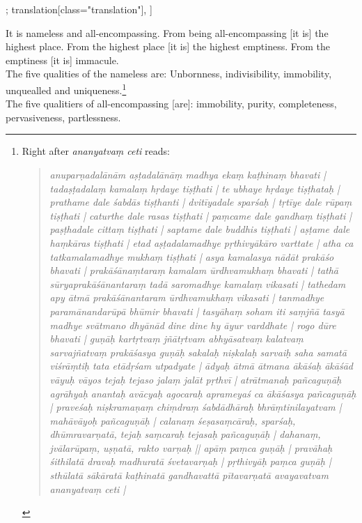 \begin{alignment}[
  texts=edition[class="edition"];
  translation[class="translation"],
  ]
\begin{translation}
\begin{tlate}
     It is nameless and all-encompassing. From being all-encompassing [it is] the highest place. From the highest place [it is] the highest emptiness. From the emptiness [it is] immacule. \\
     \indent
     The five qualities of the nameless are: Unbornness, indivisibility, immobility, unquealled and uniqueness.\footnote{Right after \textit{ananyatvaṃ ceti}  reads: \begin{quote}\textit{anuparṇadalānām aṣṭadalānāṃ madhya ekaṃ kaṭhinaṃ bhavati | tadaṣṭadalaṃ kamalaṃ hṛdaye tiṣṭhati | te ubhaye hṛdaye tiṣṭhataḥ | prathame dale śabdās tiṣṭhanti | dvitīyadale sparśaḥ | tṛtīye dale rūpaṃ tiṣṭhati | caturthe dale rasas tiṣṭhati | paṃcame dale gandhaṃ tiṣṭhati | paṣṭhadale cittaṃ tiṣṭhati | saptame dale buddhis tiṣṭhati | aṣṭame dale haṃkāras tiṣṭhati | etad aṣṭadalamadhye pṛthivyākāro varttate | atha ca tatkamalamadhye mukhaṃ tiṣṭhati | asya kamalasya nādāt prakāśo bhavati | prakāśānaṃtaraṃ kamalam ūrdhvamukhaṃ bhavati | tathā sūryaprakāśānantaraṃ tadā saromadhye kamalaṃ vikasati | tathedam apy ātmā prakāśānantaram ūrdhvamukhaṃ vikasati | tanmadhye paramānandarūpā bhūmir bhavati | tasyāhaṃ soham iti saṃjñā tasyā madhye svātmano dhyānād dine dine hy āyur varddhate | rogo dūre bhavati | guṇāḥ kartṛtvaṃ jñātṛtvam abhyāsatvaṃ kalatvaṃ sarvajñatvaṃ prakāśasya guṇāḥ sakalaḥ niṣkalaḥ sarvaiḥ saha samatā viśrāṃtiḥ tata etādṛśam utpadyate | ādyaḥ ātmā ātmana ākāśaḥ ākāśād vāyuḥ vāyos tejaḥ tejaso jalaṃ jalāt pṛthvī | atrātmanaḥ pañcaguṇāḥ agrāhyaḥ anantaḥ avācyaḥ agocaraḥ aprameyaś ca ākāśasya pañcaguṇāḥ | praveśaḥ niṣkramaṇaṃ chiṃdraṃ śabdādhāraḥ bhrāṃtinilayatvam | mahāvāyoḥ pañcaguṇāḥ | calanaṃ śeṣasaṃcāraḥ, sparśaḥ, dhūmravarṇatā, tejaḥ saṃcaraḥ tejasaḥ pañcaguṇāḥ | dahanaṃ, jvālarūpaṃ, uṣṇatā, rakto varṇaḥ || apāṃ paṃca guṇāḥ | pravāhaḥ śithilatā dravaḥ madhuratā śvetavarṇaḥ | pṛthivyāḥ paṃca guṇāḥ | sthūlatā sākāratā kaṭhinatā gandhavattā pītavarṇatā avayavatvam ananyatvaṃ ceti |}\end{quote}}\\
     \indent
     The five qualitiers of all-encompassing [are]: immobility, purity, completeness, pervasiveness, partlessness.
    \end{tlate}
  \end{translation}
\end{alignment}
\pagebreak %
